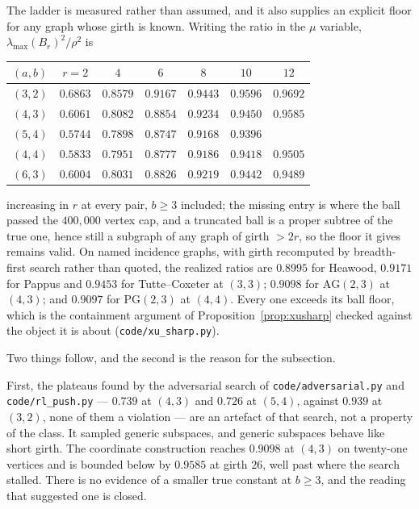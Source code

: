 \documentclass[11pt]{article}
\theoremstyle{remark}
\begin{document}
The ladder is measured rather than assumed, and it also supplies an explicit floor for any graph
whose girth is known. Writing the ratio in the $\mu$ variable,
$\lambda_{\max}(B_r)^2/\rho^2$ is
\begin{center}
\begin{tabular}{lcccccc}
$(a,b)$ & $r=2$ & $4$ & $6$ & $8$ & $10$ & $12$\\
\hline
$(3,2)$ & $0.6863$ & $0.8579$ & $0.9167$ & $0.9443$ & $0.9596$ & $0.9692$\\
$(4,3)$ & $0.6061$ & $0.8082$ & $0.8854$ & $0.9234$ & $0.9450$ & $0.9585$\\
$(5,4)$ & $0.5744$ & $0.7898$ & $0.8747$ & $0.9168$ & $0.9396$ & \\
$(4,4)$ & $0.5833$ & $0.7951$ & $0.8777$ & $0.9186$ & $0.9418$ & $0.9505$\\
$(6,3)$ & $0.6004$ & $0.8031$ & $0.8826$ & $0.9219$ & $0.9442$ & $0.9489$\\
\hline
\end{tabular}
\end{center}
increasing in $r$ at every pair, $b\ge3$ included; the missing entry is where the ball passed the
$400{,}000$ vertex cap, and a truncated ball is a proper subtree of the true one, hence still a
subgraph of any graph of girth $>2r$, so the floor it gives remains valid. On named incidence
graphs, with girth recomputed by breadth-first search rather than quoted, the realized ratios are
$0.8995$ for Heawood, $0.9171$ for Pappus and $0.9453$ for Tutte--Coxeter at $(3,3)$; $0.9098$ for
$\mathrm{AG}(2,3)$ at $(4,3)$; and $0.9097$ for $\mathrm{PG}(2,3)$ at $(4,4)$. Every one exceeds
its ball floor, which is the containment argument of Proposition~\ref{prop:xusharp} checked
against the object it is about (\texttt{code/xu\_sharp.py}).

Two things follow, and the second is the reason for the subsection.

First, the plateaus found by the adversarial search of \texttt{code/adversarial.py} and
\texttt{code/rl\_push.py} --- $0.739$ at $(4,3)$ and $0.726$ at $(5,4)$, against $0.939$ at
$(3,2)$, none of them a violation --- are an artefact of that search, not a property of the
class. It sampled generic subspaces, and generic subspaces behave like short
girth. The coordinate construction reaches $0.9098$ at $(4,3)$ on twenty-one vertices and is
bounded below by $0.9585$ at girth $26$, well past where the search stalled. There is no evidence of a smaller true constant at
$b\ge3$, and the reading that suggested one is closed.
\end{document}

